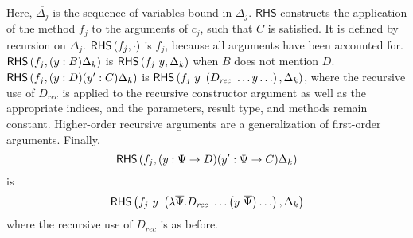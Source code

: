 \documentclass[runningheads]{llncs}
\begin{document}
Here, $\overline{\Delta_j}$ is the sequence of variables bound in $\Delta_j$.
$\mathsf{RHS}$ constructs the application of the method $f_j$ to the arguments of $c_j$, such that $C$ is satisfied.
It is defined by recursion on $\Delta_j$.
$\mathsf{RHS}\left(f_j, \cdot\right)$ is $f_j$, because all arguments have been accounted for.
$\mathsf{RHS}\left(f_j, (y : B)\Delta_k\right)$ is $\mathsf{RHS}\left(f_j\ y, \Delta_k\right)$ when $B$ does not mention $D$.
$\mathsf{RHS}\left(f_j, (y : D) (y^\prime : C)\Delta_k\right)$ is $\RHSap{f_j\ y\ \left(D_{\mathit{rec}}\ \ldots y \ldots\right)}{\Delta_k}$, where the recursive use of $D_{\mathit{rec}}$ is applied to the recursive constructor argument as well as the appropriate indices, and the parameters, result type, and methods remain constant.
Higher-order recursive arguments are a generalization of first-order arguments.
Finally,
\begin{displaymath}
\mathsf{RHS}\left(f_j, (y : \Psi \to D) (y^\prime : \Psi \to C)\Delta_k\right)
\end{displaymath}
is
\begin{displaymath}
\RHSap{f_j\ y\ \left(\lambda \overline{\Psi} . D_{\mathit{rec}}\ \ldots \left(y\ \overline{\Psi} \right) \ldots\right)}{\Delta_k}
\end{displaymath}
where the recursive use of $D_{\mathit{rec}}$ is as before.

\end{document}

